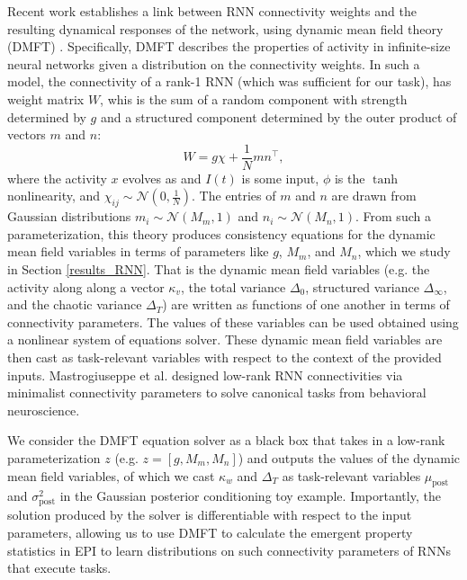 \documentclass[11pt]{article}
\begin{document}
Recent work establishes a link between RNN connectivity weights and the resulting dynamical responses of the network, using dynamic mean field theory (DMFT) \cite{mastrogiuseppe2018linking}.
Specifically, DMFT describes the properties of activity in infinite-size neural networks given a distribution on the connectivity weights.
In such a model, the connectivity of a rank-1 RNN (which was sufficient for our task), has weight matrix $W$, whis is the sum of a random component with strength determined by $g$ and a structured component determined by the outer product of vectors $m$ and $n$:
\begin{equation}
W = g\chi + \frac{1}{N}mn^\top,
\end{equation}
where the activity $x$ evolves as
and $I(t)$ is some input, $\phi$ is the $\tanh$ nonlinearity, and  $\chi_{ij} \sim \mathcal{N}(0, \frac{1}{N})$.  
The entries of $m$ and $n$ are drawn from Gaussian distributions $m_i \sim \mathcal{N}(M_m, 1)$ and $n_i \sim \mathcal{N}(M_n, 1)$. From such a parameterization, this theory produces consistency equations for the dynamic mean field variables in terms of parameters like $g$, $M_m$, and $M_n$, which we study in Section \ref{results_RNN}.  That is the dynamic mean field variables (e.g. the activity along along a vector $\kappa_v$, the total variance $\Delta_0$, structured variance $\Delta_\infty$, and the chaotic variance $\Delta_T$) are written as functions of one another in terms of connectivity parameters.  The values of these variables can be used obtained using a nonlinear system of equations solver.  These dynamic mean field variables are then cast as task-relevant variables with respect to the context of the provided inputs. Mastrogiuseppe et al. designed low-rank RNN connectivities via minimalist connectivity parameters to solve canonical tasks from behavioral neuroscience. 

We consider the DMFT equation solver as a black box that takes in a low-rank parameterization $z$ (e.g. $z = \left[ g, M_m, M_n\right]$)  and outputs the values of the dynamic mean field variables, of which we cast $\kappa_w$ and $\Delta_T$ as task-relevant variables $\mu_{\text{post}}$ and $\sigma^2_{\text{post}}$ in the Gaussian posterior conditioning toy example.
Importantly, the solution produced by the solver is differentiable with respect to the input parameters, allowing us to use DMFT to calculate the emergent property statistics in EPI to learn distributions on such connectivity parameters of RNNs that execute tasks.
\end{document}
